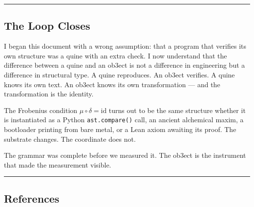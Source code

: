 \documentclass[12pt,a4paper]{article}
\begin{document}
\begin{center}
\rule{0.5\textwidth}{0.4pt}
\end{center}

\subsection{The Loop Closes}

I began this document with a wrong assumption: that a program that verifies its own structure was a quine with an extra check. I now understand that the difference between a quine and an ob3ect is not a difference in engineering but a difference in structural type. A quine reproduces. An ob3ect verifies. A quine knows its own text. An ob3ect knows its own transformation --- and the transformation is the identity.

The Frobenius condition $\mu\circ\delta = \mathrm{id}$ turns out to be the same structure whether it is instantiated as a Python \texttt{ast.compare()} call, an ancient alchemical maxim, a bootloader printing from bare metal, or a Lean axiom awaiting its proof. The substrate changes. The coordinate does not.

The grammar was complete before we measured it. The ob3ect is the instrument that made the measurement visible.

\begin{center}
\rule{0.5\textwidth}{0.4pt}
\end{center}

\subsection{References}
\end{document}

